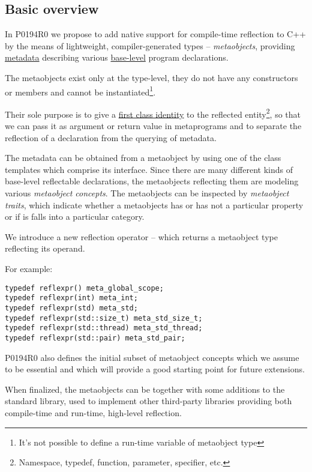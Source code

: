 \subsection{Basic overview}

In P0194R0 we propose to add native support for
compile-time reflection to C++ by the means of lightweight, compiler-generated
types -- {\em metaobjects}, providing \hyperref[term-metadata]{metadata}
describing various \hyperref[term-base-meta-level]{base-level} program declarations.

The metaobjects exist only at the type-level, they do not have any constructors
or members and cannot be instantiated\footnote{It's not possible to define
a run-time variable of metaobject type}.

Their sole purpose is to give a \hyperref[term-first-class]{first class identity}
to the reflected entity\footnote{Namespace, typedef, function, parameter, specifier, etc.},
so that we can pass it as argument or return value in metaprograms and to
separate the reflection of a declaration from the querying of metadata.

The metadata can be obtained from a metaobject by using one of the class templates
which comprise its interface.
Since there are many different kinds of
base-level reflectable declarations, the metaobjects reflecting them are
modeling various {\em metaobject concepts}. The metaobjects can be inspected
by {\em metaobject traits}, which indicate whether a metaobjects has or has
not a particular property or if is falls into a particular category.

We introduce a new reflection operator -- \verb@reflexpr@ which returns a
metaobject type reflecting its operand.

For example:

\begin{verbatim}
typedef reflexpr() meta_global_scope;
typedef reflexpr(int) meta_int;
typedef reflexpr(std) meta_std;
typedef reflexpr(std::size_t) meta_std_size_t;
typedef reflexpr(std::thread) meta_std_thread;
typedef reflexpr(std::pair) meta_std_pair;
\end{verbatim}

P0194R0 also defines the initial subset
of metaobject concepts which we assume to be essential
and which will provide a good starting point for future extensions.

When finalized, the metaobjects can be together with some additions
to the standard library, used to implement other third-party libraries
providing both compile-time and run-time, high-level reflection.

